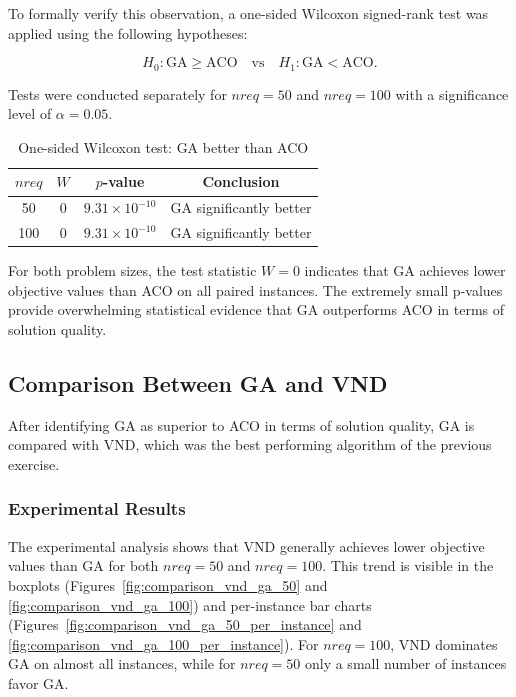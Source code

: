 \documentclass[12pt]{article}
\begin{document}
To formally verify this observation, a one-sided Wilcoxon signed-rank test was
applied using the following hypotheses:

\[
H_0: \text{GA} \ge \text{ACO} \quad \text{vs} \quad
H_1: \text{GA} < \text{ACO}.
\]

Tests were conducted separately for $nreq=50$ and $nreq=100$ with a significance
level of $\alpha = 0.05$.

\begin{table}[h]
\centering
\caption{One-sided Wilcoxon test: GA better than ACO}
\label{tab:one_ga_aco}
\begin{tabular}{c c c c}
\hline
$nreq$ & $W$ & $p$-value & Conclusion \\
\hline
50  & 0 & $9.31 \times 10^{-10}$ & GA significantly better \\
100 & 0 & $9.31 \times 10^{-10}$ & GA significantly better \\
\hline
\end{tabular}
\end{table}

For both problem sizes, the test statistic $W=0$ indicates that GA achieves lower
objective values than ACO on all paired instances. The extremely small p-values
provide overwhelming statistical evidence that GA outperforms ACO in terms of
solution quality.

\subsection{Comparison Between GA and VND}

After identifying GA as superior to ACO in terms of solution quality, GA is compared with VND, which was the best performing algorithm of the previous exercise.

\subsubsection{Experimental Results}

The experimental analysis shows that VND generally achieves lower objective
values than GA for both $nreq=50$ and $nreq=100$. This trend is visible in the
boxplots (Figures~\ref{fig:comparison_vnd_ga_50} and \ref{fig:comparison_vnd_ga_100}) and per-instance bar charts (Figures~\ref{fig:comparison_vnd_ga_50_per_instance} and \ref{fig:comparison_vnd_ga_100_per_instance}). For $nreq=100$, VND dominates GA on almost
all instances, while for $nreq=50$ only a small number of instances favor GA.
\end{document}
